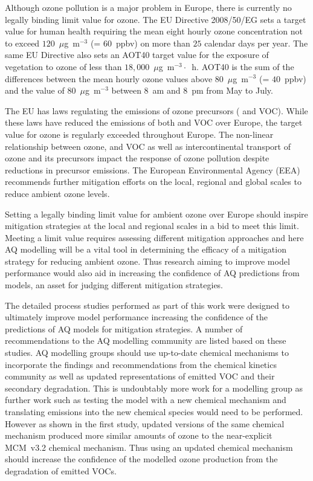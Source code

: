 Although ozone pollution is a major problem in Europe, there is currently no legally binding limit value for ozone.
The EU Directive 2008/50/EG sets a target value for human health requiring the mean eight hourly ozone concentration not to exceed $120$~$\mu$g~m$^{-3}$ (= $60$~ppbv) on more than $25$ calendar days per year.
The same EU Directive also sets an AOT40 target value for the exposure of vegetation to ozone of less than $18,000$~$\mu$g~m$^{-3} \cdot$~h. 
AOT40 is the sum of the differences between the mean hourly ozone values above $80$~$\mu$g~m$^{-3}$ (= $40$~ppbv) and the value of $80$~$\mu$g~m$^{-3}$ between 8~am and 8~pm from May to July.

The EU has laws regulating the emissions of ozone precursors ( and VOC).
While these laws have reduced the emissions of both  and VOC over Europe, the target value for ozone is regularly exceeded throughout Europe.
The non-linear relationship between ozone,  and VOC as well as intercontinental transport of ozone and its precursors impact the response of ozone pollution despite reductions in precursor emissions.
The European Environmental Agency (EEA) recommends further mitigation efforts on the local, regional and global scales to reduce ambient ozone levels.

Setting a legally binding limit value for ambient ozone over Europe should inspire mitigation strategies at the local and regional scales in a bid to meet this limit.
Meeting a limit value requires assessing different mitigation approaches and here AQ modelling will be a vital tool in determining the efficacy of a mitigation strategy for reducing ambient ozone. 
Thus research aiming to improve model performance would also aid in increasing the confidence of AQ predictions from models, an asset for judging different mitigation strategies.

\newpage
The detailed process studies performed as part of this work were designed to ultimately improve model performance increasing the confidence of the predictions of AQ models for mitigation strategies.
A number of recommendations to the AQ modelling community are listed based on these studies.
AQ modelling groups should use up-to-date chemical mechanisms to incorporate the findings and recommendations from the chemical kinetics community as well as updated representations of emitted VOC and their secondary degradation.
This is undoubtably more work for a modelling group as further work such as testing the model with a new chemical mechanism and translating emissions into the new chemical species would need to be performed.
However as shown in the first study, updated versions of the same chemical mechanism produced more similar amounts of ozone to the near-explicit MCM~v3.2 chemical mechanism.
Thus using an updated chemical mechanism should increase the confidence of the modelled ozone production from the degradation of emitted VOCs.

